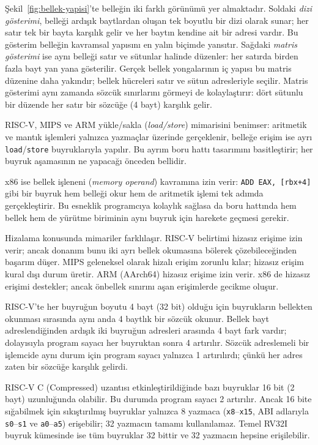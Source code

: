 Şekil~\ref{fig:bellek-yapisi}'te belleğin iki farklı görünümü yer almaktadır. Soldaki \emph{dizi gösterimi}, belleği ardışık baytlardan oluşan tek boyutlu bir dizi olarak sunar; her satır tek bir bayta karşılık gelir ve her baytın kendine ait bir adresi vardır. Bu gösterim belleğin kavramsal yapısını en yalın biçimde yansıtır. Sağdaki \emph{matris gösterimi} ise aynı belleği satır ve sütunlar halinde düzenler: her satırda birden fazla bayt yan yana gösterilir. Gerçek bellek yongalarının iç yapısı bu matris düzenine daha yakındır; bellek hücreleri satır ve sütun adresleriyle seçilir. Matris gösterimi aynı zamanda sözcük sınırlarını görmeyi de kolaylaştırır: dört sütunlu bir düzende her satır bir sözcüğe (4 bayt) karşılık gelir.

\begin{karsilastirma}
RISC-V, MIPS ve ARM yükle/sakla (\emph{load/store}) mimarisini benimser: aritmetik ve mantık işlemleri yalnızca yazmaçlar üzerinde gerçeklenir, belleğe erişim ise ayrı \texttt{load}/\texttt{store} buyruklarıyla yapılır. Bu ayrım boru hattı tasarımını basitleştirir; her buyruk aşamasının ne yapacağı önceden bellidir.

x86 ise bellek işleneni (\emph{memory operand}) kavramına izin verir: \texttt{ADD EAX, [rbx+4]} gibi bir buyruk hem belleği okur hem de aritmetik işlemi tek adımda gerçekleştirir. Bu esneklik programcıya kolaylık sağlasa da boru hattında hem bellek hem de yürütme biriminin aynı buyruk için harekete geçmesi gerekir.

Hizalama konusunda mimariler farklılaşır. RISC-V belirtimi hizasız erişime izin verir; ancak donanım bunu iki ayrı bellek okumasına bölerek çözebileceğinden başarım düşer. MIPS geleneksel olarak hizalı erişim zorunlu kılar; hizasız erişim kural dışı durum üretir. ARM (AArch64) hizasız erişime izin verir. x86 de hizasız erişimi destekler; ancak önbellek sınırını aşan erişimlerde gecikme oluşur.
\end{karsilastirma}

RISC-V'te her buyruğun boyutu 4 bayt (32 bit) olduğu için buyrukların bellekten okunması sırasında aynı anda 4 baytlık bir sözcük okunur. Bellek bayt adreslendiğinden ardışık iki buyruğun adresleri arasında 4 bayt fark vardır; dolayısıyla program sayacı her buyruktan sonra 4 artırılır. Sözcük adreslemeli bir işlemcide aynı durum için program sayacı yalnızca 1 artırılırdı; çünkü her adres zaten bir sözcüğe karşılık gelirdi.

\begin{bilginot}
RISC-V C (Compressed) uzantısı etkinleştirildiğinde bazı buyruklar 16 bit (2 bayt) uzunluğunda olabilir. Bu durumda program sayacı 2 artırılır. Ancak 16 bite sığabilmek için sıkıştırılmış buyruklar yalnızca 8 yazmaca (\texttt{x8}--\texttt{x15}, ABI adlarıyla \texttt{s0}--\texttt{s1} ve \texttt{a0}--\texttt{a5}) erişebilir; 32 yazmacın tamamı kullanılamaz. Temel RV32I buyruk kümesinde ise tüm buyruklar 32 bittir ve 32 yazmacın hepsine erişilebilir.
\end{bilginot}

